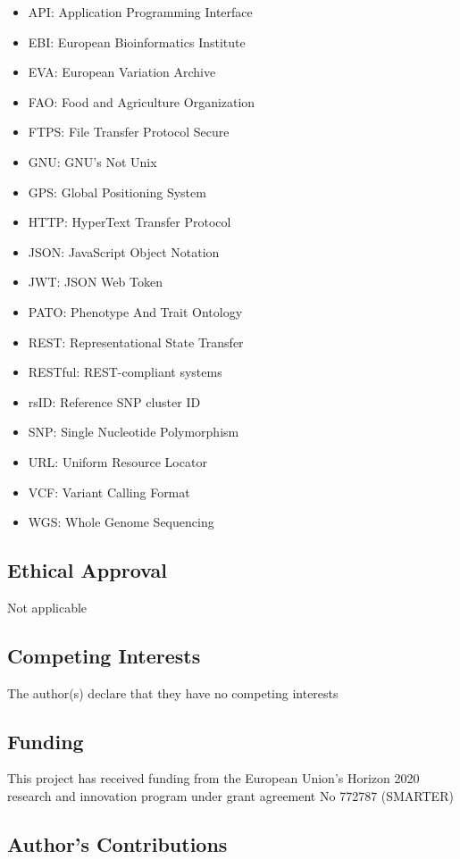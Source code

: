 \documentclass[a4paper,num-refs,gigabyte]{oup-contemporary}
\begin{document}
\begin{itemize}
\item API: Application Programming Interface
\item EBI: European Bioinformatics Institute
\item EVA: European Variation Archive
\item FAO: Food and Agriculture Organization
\item FTPS: File Transfer Protocol Secure
\item GNU: GNU's Not Unix
\item GPS: Global Positioning System
\item HTTP: HyperText Transfer Protocol
\item JSON: JavaScript Object Notation
\item JWT: JSON Web Token
\item PATO: Phenotype And Trait Ontology
\item REST: Representational State Transfer
\item RESTful: REST-compliant systems
\item rsID: Reference SNP cluster ID
\item SNP: Single Nucleotide Polymorphism
\item URL: Uniform Resource Locator
\item VCF: Variant Calling Format
\item WGS: Whole Genome Sequencing
\end{itemize}

\subsection{Ethical Approval}

Not applicable

\subsection{Competing Interests}

The author(s) declare that they have no competing interests

\subsection{Funding}

This project has received funding from the European Union’s Horizon 2020 research and innovation program under grant agreement No 772787 (SMARTER)

\subsection{Author's Contributions}
\end{document}
